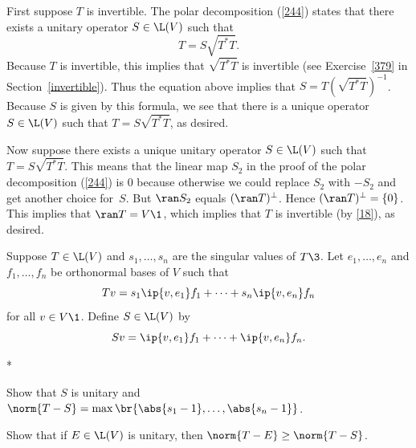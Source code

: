 \begin{Solution}
First suppose $T$ is invertible.  The polar decomposition (\ref{244}) states
that there exists a unitary operator $S \in \L(V)$ such that
\[
T = S \sqrt{T^* T}.
\]
Because $T$ is invertible, this implies that $\sqrt{T^* T}$ is invertible (see
Exercise~\ref{379} in Section~\ref{invertible}).  Thus the equation above implies that
$S = T {(\sqrt{T^* T})}^{-1}$.  Because $S$ is given by this formula, we see
that there is a unique operator $S \in \L(V)$ such that $T = S \sqrt{T^* T}$, as
desired.

Now suppose there exists a unique unitary operator $S \in \L(V)$ such that
$T = S \sqrt{T^* T}$.  This means that the linear map $S_2$ in the proof of the
polar decomposition (\ref{244}) is $0$ because otherwise we could
replace $S_2$ with $-S_2$ and get another choice for~$S$.  But $\ran S_2$ equals
$(\ran T)^\perp$. Hence $(\ran T)^\perp = \{0\}$.  This implies that
$\ran T = V\1$, which implies that $T$ is invertible (by \ref{18}), as desired.
\end{Solution}

\exercise
Suppose $T \in \L(V)$ and $s_1, \ldots, s_n$ are the singular values of $T\3$. Let $e_1, \ldots, e_n$ and $f_1, \ldots, f_n$ be orthonormal bases of $V$ such that \label{7unitary}
\[
Tv = s_1\ip{v, e_1} f_1 + \cdots + s_n \ip{v, e_n} f_n
\]
for all $v \in V\1$. Define $S \in \L(V)$ by
\[
Sv = \ip{v, e_1} f_1 + \cdots + \ip{v, e_n} f_n.
\]
\begin{subtheorem}*
\item
Show that $S$ is unitary and $\norm{T-S} = \max \br{ \abs{s_1 -1}, \ldots, \abs{s_n - 1} }$.
\item
Show that if $E \in \L(V)$ is unitary, then $\norm{T-E} \ge \norm{T-S}$.
\end{subtheorem}

